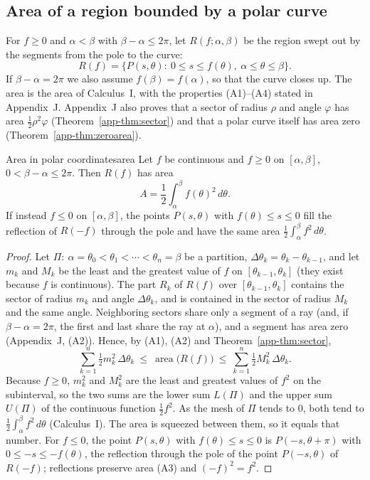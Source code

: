\documentclass[11pt]{article}
\begin{document}
\subsection*{Area of a region bounded by a polar curve}

For $f\ge0$ and $\alpha<\beta$ with $\beta-\alpha\le2\pi$, let $R(f;\alpha,\beta)$ be the region swept out by the segments from the pole to the curve:
\[
R(f)=\{P(s,\theta):\ 0\le s\le f(\theta),\ \alpha\le\theta\le\beta\}.
\]
If $\beta-\alpha=2\pi$ we also assume $f(\beta)=f(\alpha)$, so that the curve closes up. The area is the area of Calculus~I, with the properties (A1)--(A4) stated in Appendix~J. Appendix~J also proves that a sector of radius $\rho$ and angle $\varphi$ has area $\frac12\rho^2\varphi$ (Theorem~\ref{app-thm:sector}) and that a polar curve itself has area zero (Theorem~\ref{app-thm:zeroarea}).

\begin{thm}{Area in polar coordinates}{area}
Let $f$ be continuous and $f\ge0$ on $[\alpha,\beta]$, $0<\beta-\alpha\le2\pi$. Then $R(f)$ has area
\[
A=\frac12\int_\alpha^\beta f(\theta)^2\,d\theta .
\]
If instead $f\le0$ on $[\alpha,\beta]$, the points $P(s,\theta)$ with $f(\theta)\le s\le0$ fill the reflection of $R(-f)$ through the pole and have the same area $\frac12\int_\alpha^\beta f^2\,d\theta$.
\end{thm}
\begin{proof}
Let $\Pi:\ \alpha=\theta_0<\theta_1<\cdots<\theta_n=\beta$ be a partition, $\Delta\theta_k=\theta_k-\theta_{k-1}$, and let $m_k$ and $M_k$ be the least and the greatest value of $f$ on $[\theta_{k-1},\theta_k]$ (they exist because $f$ is continuous). The part $R_k$ of $R(f)$ over $[\theta_{k-1},\theta_k]$ contains the sector of radius $m_k$ and angle $\Delta\theta_k$, and is contained in the sector of radius $M_k$ and the same angle. Neighboring sectors share only a segment of a ray (and, if $\beta-\alpha=2\pi$, the first and last share the ray at $\alpha$), and a segment has area zero (Appendix~J, (A2)). Hence, by (A1), (A2) and Theorem~\ref{app-thm:sector},
\[
\sum_{k=1}^n\tfrac12m_k^2\,\Delta\theta_k\ \le\ \operatorname{area}\bigl(R(f)\bigr)\ \le\ \sum_{k=1}^n\tfrac12M_k^2\,\Delta\theta_k .
\]
Because $f\ge0$, $m_k^2$ and $M_k^2$ are the least and greatest values of $f^2$ on the subinterval, so the two sums are the lower sum $L(\Pi)$ and the upper sum $U(\Pi)$ of the continuous function $\frac12f^2$. As the mesh of $\Pi$ tends to $0$, both tend to $\frac12\int_\alpha^\beta f^2\,d\theta$ (Calculus~I). The area is squeezed between them, so it equals that number. For $f\le0$, the point $P(s,\theta)$ with $f(\theta)\le s\le0$ is $P(-s,\theta+\pi)$ with $0\le-s\le-f(\theta)$, the reflection through the pole of the point $P(-s,\theta)$ of $R(-f)$; reflections preserve area (A3) and $(-f)^2=f^2$.
\end{proof}
\end{document}
